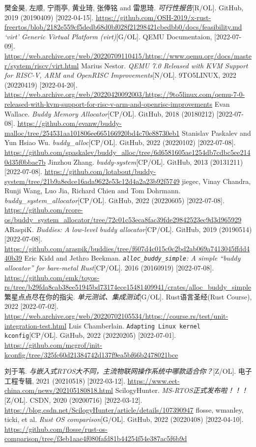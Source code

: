 \documentclass{../runikraft-report}
\begin{document}
\begin{thebibliography}{99}
 樊金昊, 左顺, 宁雨亭, 黄业琦, 张俸铭 and 雷思琦. \textit{可行性报告}[R/OL]. GitHub, 2019 (20190409) [2022-04-15]. \url{https://github.com/OSH-2019/x-rust-freertos/blob/2182e559cf5dedb68d0bf028f21298421cbedbb0/docs/feasibility.md}
 \textit{`virt' Generic Virtual Platform (virt)}[G/OL]. QEMU Documentaion, [2022-07-09]. \url{https://web.archive.org/web/20220709110415/https://www.qemu.org/docs/master/system/riscv/virt.html}
 Marius Nestor. \textit{QEMU 7.0 Released with KVM Support for RISC-V, ARM and OpenRISC Improvements}[N/OL]. 9TO5LINUX, 2022 (20220419) [2022-04-20]. \url{https://web.archive.org/web/20220420092003/https://9to5linux.com/qemu-7-0-released-with-kvm-support-for-risc-v-arm-and-openrisc-improvements}
 Evan Wallace. \textit{Buddy Memory Allocator}[CP/OL]. GitHub, 2018 (20180212) [2022-07-08]. \url{https://github.com/evanw/buddy-malloc/tree/254531aa101806ee665166920bd4c70e88730eb1}
 Stanislav Paskalev and Yun Hsiao Wu. \textit{buddy\_alloc}[CP/OL]. GitHub, 2022 (20220102) [2022-07-08]. \url{https://github.com/spaskalev/buddy_alloc/tree/6d6581605ae1254db7cdbc5ee2140d35f0bbac7b}
 Jinzhou Zhang. \textit{buddy-system}[CP/OL]. GitHub, 2013 (20131211) [2022-07-08]. \url{https://github.com/lotabout/buddy-system/tree/21b9a8edce16ada9622e53c12d4a2a23b92f5749}
 jiegec, Vinay Chandra, Runji Wang, Luo Jia, Richard Chien and
Tom Dohrmann. \textit{buddy\_system\_allocator}[CP/OL]. GitHub, 2022 (20220605) [2022-07-08]. \url{https://github.com/rcore-os/buddy_system_allocator/tree/72c01c53eca8fac39fde29842523ec9d3d965929}
 ARaspiK. \textit{Buddies: A low-level buddy allocator}[CP/OL]. GitHub, 2019 (20190514) [2022-07-08]. \url{https://github.com/araspik/buddies/tree/f607d4c015c0c2bd2ab069a7413045ffdd440b39}
 Eric Kidd and Jethro Beekman. \textit{\texttt{alloc\_buddy\_simple}: A simple ``buddy allocator'' for bare-metal Rust}[CP/OL]. 2016 (20160919) [2022-07-08]. \url{https://github.com/emk/toyos-rs/tree/b29fda8cab38ee51945bd73174ece15481409941/crates/alloc_buddy_simple}
 繁星点点尽在你的指尖. \textit{单元测试、集成测试}[G/OL].
Rust语言圣经(Rust Course), 2022 [2022-07-02]. \url{https://web.archive.org/web/20220702105534/https://course.rs/test/unit-integration-test.html}
 Luis Chamberlain. \texttt{Adapting Linux kernel kconfig}[CP/OL]. GitHub, 2022 (20220205) [2022-07-01]. \url{https://github.com/mcgrof/init-kconfig/tree/325fc60d21384742d137f9ea5bf66b2478021bce}

 刘于苇. \textit{与嵌入式RTOS大不同，主流物联网操作系统中哪款适合你？}[Z/OL].
电子工程专辑, 2021 (20210518) [2022-03-12]. \url{https://www.eet-china.com/news/202105180818.html}
 ScilogyHunter. \textit{MS-RTOS正式发布啦！！！}[Z/OL]. CSDN, 2020 (20200716) [2022-03-12]. \url{https://blog.csdn.net/ScilogyHunter/article/details/107390947}
 flosse, wmanley, ticki, et al. \textit{Rust OS comparison}[G/OL]. GitHub, 2022 (20220408) [2022-04-10]. \url{https://github.com/flosse/rust-os-comparison/tree/f3eb1aae4f080fafd81b44254f54e387ac5f6b9d}
\end{thebibliography}
\end{document}
